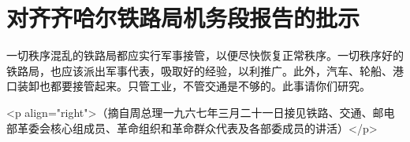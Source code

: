 \section[对齐齐哈尔铁路局机务段报告的批示（一九六七年三月二十日）]{对齐齐哈尔铁路局机务段报告的批示}


一切秩序混乱的铁路局都应实行军事接管，以便尽快恢复正常秩序。一切秩序好的铁路局，也应该派出军事代表，吸取好的经验，以利推广。此外，汽车、轮船、港口装卸也都要接管起来。只管工业，不管交通是不够的。此事请你们研究。

<p align="right">（摘自周总理一九六七年三月二十一日接见铁路、交通、邮电部革委会核心组成员、革命组织和革命群众代表及各部委成员的讲活）</p>


